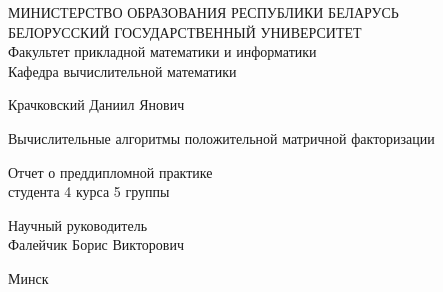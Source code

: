 \begin{titlepage}

\begin{center}
  МИНИСТЕРСТВО ОБРАЗОВАНИЯ РЕСПУБЛИКИ БЕЛАРУСЬ \\
  БЕЛОРУССКИЙ ГОСУДАРСТВЕННЫЙ УНИВЕРСИТЕТ \\

  Факультет прикладной математики и информатики \\
  Кафедра вычислительной математики
\end{center}

\vspace{8em}

  \begin{center}
    \Large Крачковский Даниил Янович
  \end{center}

  \begin{center}
    \Large Вычислительные алгоритмы положительной матричной факторизации
  \end{center}

  \vspace{2.5em}

  \begin{center}
    Отчет о преддипломной практике \\
    студента 4 курса 5 группы
  \end{center}

  \vspace{6em}

  \begin{flushright}
    Научный руководитель \\
    Фалейчик Борис Викторович
  \end{flushright}

  \vfill

  \begin{center}
    Минск \date{\today}
  \end{center}

\end{titlepage}
